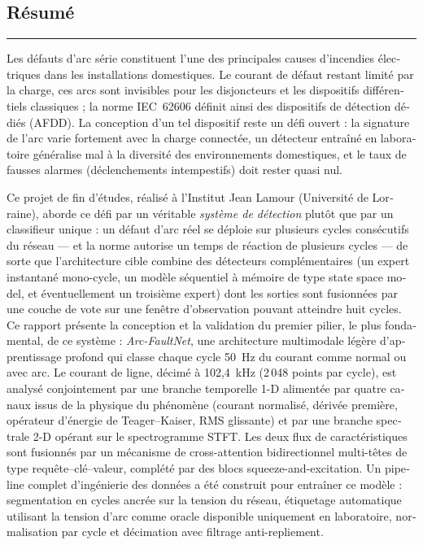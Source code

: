 \begin{otherlanguage}{french}

\section*{Résumé}

\noindent\rule{\linewidth}{1pt}
\vspace{0.3cm}

\noindent Les défauts d'arc série constituent l'une des principales causes d'incendies électriques dans les installations domestiques. Le courant de défaut restant limité par la charge, ces arcs sont invisibles pour les disjoncteurs et les dispositifs différentiels classiques ; la norme IEC~62606 définit ainsi des dispositifs de détection dédiés (AFDD). La conception d'un tel dispositif reste un défi ouvert : la signature de l'arc varie fortement avec la charge connectée, un détecteur entraîné en laboratoire généralise mal à la diversité des environnements domestiques, et le taux de fausses alarmes (déclenchements intempestifs) doit rester quasi nul.

\medskip

\noindent Ce projet de fin d'études, réalisé à l'Institut Jean Lamour (Université de Lorraine), aborde ce défi par un véritable \emph{système de détection} plutôt que par un classifieur unique : un défaut d'arc réel se déploie sur plusieurs cycles consécutifs du réseau --- et la norme autorise un temps de réaction de plusieurs cycles --- de sorte que l'architecture cible combine des détecteurs complémentaires (un expert instantané mono-cycle, un modèle séquentiel à mémoire de type state space model, et éventuellement un troisième expert) dont les sorties sont fusionnées par une couche de vote sur une fenêtre d'observation pouvant atteindre huit cycles. Ce rapport présente la conception et la validation du premier pilier, le plus fondamental, de ce système : \emph{Arc-FaultNet}, une architecture multimodale légère d'apprentissage profond qui classe chaque cycle 50~Hz du courant comme normal ou avec arc. Le courant de ligne, décimé à 102,4~kHz (2\,048 points par cycle), est analysé conjointement par une branche temporelle 1-D alimentée par quatre canaux issus de la physique du phénomène (courant normalisé, dérivée première, opérateur d'énergie de Teager--Kaiser, RMS glissante) et par une branche spectrale 2-D opérant sur le spectrogramme STFT. Les deux flux de caractéristiques sont fusionnés par un mécanisme de cross-attention bidirectionnel multi-têtes de type requête--clé--valeur, complété par des blocs squeeze-and-excitation. Un pipeline complet d'ingénierie des données a été construit pour entraîner ce modèle : segmentation en cycles ancrée sur la tension du réseau, étiquetage automatique utilisant la tension d'arc comme oracle disponible uniquement en laboratoire, normalisation par cycle et décimation avec filtrage anti-repliement.


\end{otherlanguage}
